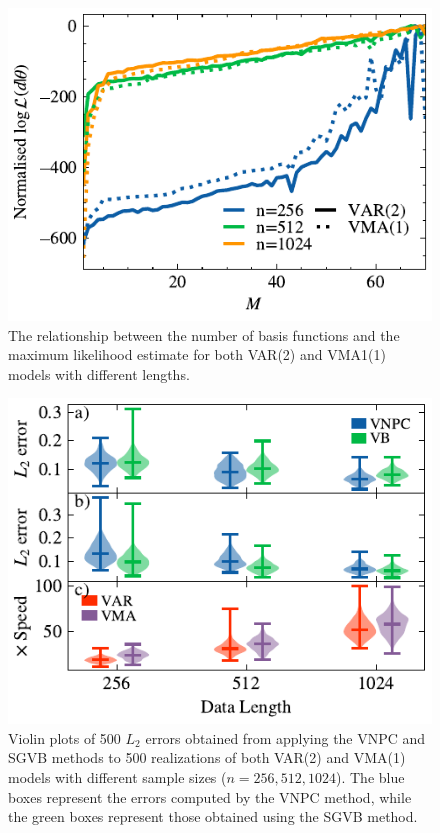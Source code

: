 \documentclass[%
 reprint,
 amsmath,amssymb,
 aps,
]{revtex4-2}
\begin{document}
\begin{figure}[h]
  \includegraphics[width=\columnwidth]{sim_basis.pdf}
  \caption{The relationship between the number of basis functions and the maximum likelihood estimate for both VAR(2) and VMA1(1) models with different lengths. }
  \label{sim_basis}
\end{figure}


\begin{figure}
  \includegraphics[width=\columnwidth]{sim_error_violins.pdf}
  \caption{
  Violin plots of 500  $L_2$ errors obtained from applying the VNPC and SGVB methods to 500 realizations of both VAR(2) and VMA(1) models with different sample sizes ($n = 256, 512, 1024$). The blue boxes represent the errors computed by the VNPC method, while the green boxes represent those obtained using the SGVB method.}
  \label{sim_error_violins}
\end{figure}
\end{document}
